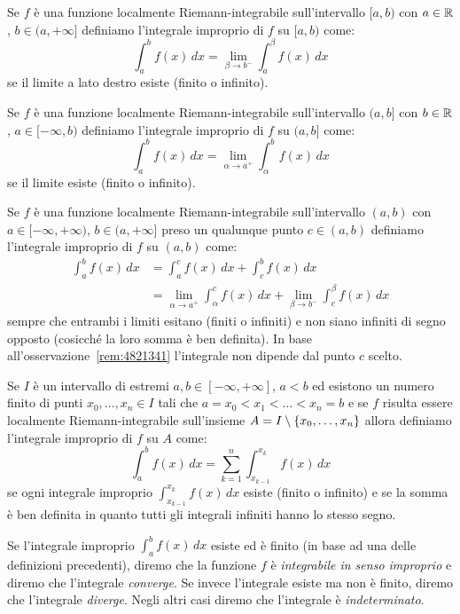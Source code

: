 \begin{definition}
\label{def:integrale_improprio}
Se $f$ è una funzione localmente Riemann-integrabile sull'intervallo $[a,b)$
con $a\in \mathbb R$, $b\in (a,+\infty]$ definiamo l'integrale improprio
di $f$ su $[a,b)$ come:
\[
  \int_a^b f(x)\, dx = \lim_{\beta \to b^-} \int_a^\beta f(x)\, dx
\]
se il limite a lato destro esiste (finito o infinito).

Se $f$ è una funzione localmente Riemann-integrabile sull'intervallo $(a,b]$
con $b\in \mathbb R$, $a\in [-\infty,b)$ definiamo l'integrale improprio
di $f$ su $(a,b]$ come:
\[
  \int_a^b f(x)\, dx = \lim_{\alpha \to a^+} \int_\alpha^b f(x)\, dx
\]
se il limite esiste (finito o infinito).

Se $f$ è una funzione localmente Riemann-integrabile sull'intervallo $(a,b)$
con $a\in [-\infty,+\infty)$, $b\in(a,+\infty]$ preso un qualunque
punto $c\in (a,b)$
definiamo l'integrale improprio di $f$ su $(a,b)$ come:
\begin{align*}
  \int_a^b f(x)\, dx &=
  \int_a^c f(x)\, dx + \int_c^b f(x)\, dx \\
  &= \lim_{\alpha \to a^+}\int_\alpha^c f(x)\,dx
    + \lim_{\beta\to b^-}\int_c^\beta f(x)\, dx
\end{align*}
sempre che entrambi i limiti esitano (finiti o infiniti) e non siano infiniti
di segno opposto (cosicché la loro somma è ben definita). In base
all'osservazione~\ref{rem:4821341} l'integrale non dipende
dal punto $c$ scelto.

Se $I$ è un intervallo di estremi $a,b\in [-\infty, +\infty]$, $a<b$
ed esistono un numero finito di punti $x_0,\dots,x_n \in I$ tali che
$a = x_0 < x_1 < \dots < x_n = b$ e se
$f$ risulta essere localmente Riemann-integrabile sull'insieme
$A=I\setminus{\left\{ x_0, \dots, x_n \right\}}$ allora definiamo
l'integrale improprio di $f$ su $A$ come:
\[
  \int_a^b f(x)\, dx = \sum_{k=1}^n \int_{x_{k-1}}^{x_k} f(x)\, dx
\]
se ogni integrale improprio $\int_{x_{k-1}}^{x_k} f(x)\, dx$ esiste (finito o infinito)
e se la somma è ben definita in quanto tutti gli integrali infiniti
hanno lo stesso segno.

Se l'integrale improprio $\int_a^b f(x)\, dx$ esiste ed è finito
(in base ad una delle definizioni precedenti), diremo che
la funzione $f$ è
\emph{integrabile in senso improprio}
e diremo che l'integrale \emph{converge}.
%
%
%
%
Se invece l'integrale esiste ma non è finito, diremo che l'integrale
\emph{diverge}.
%
%
%
%
Negli altri casi diremo che l'integrale è
\emph{indeterminato}.
%
%
%


\end{definition}
